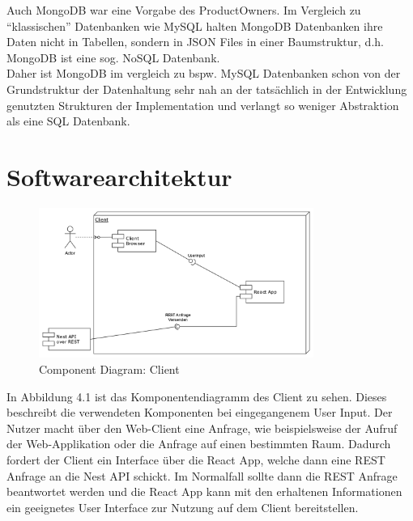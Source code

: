 Auch MongoDB war eine Vorgabe des ProductOwners.
Im Vergleich zu “klassischen” Datenbanken wie MySQL halten MongoDB Datenbanken ihre Daten nicht in Tabellen, sondern in JSON Files in einer Baumstruktur, d.h. MongoDB ist eine sog. NoSQL Datenbank. \\
Daher ist MongoDB im vergleich zu bspw. MySQL Datenbanken schon von der Grundstruktur der Datenhaltung sehr nah an der tatsächlich in der Entwicklung genutzten Strukturen der Implementation und verlangt so weniger Abstraktion als eine SQL Datenbank.
\pagebreak
\section{Softwarearchitektur}

\begin{figure}[!h]
    \centering
    \includegraphics[width=0.8\textwidth]{./UML_Diagrams/ComponentDiagramClient.png}
    \caption{Component Diagram: Client}
    \label{fig:ComponentDiagramClient}
\end{figure}
In Abbildung 4.1 ist das Komponentendiagramm des Client zu sehen.
Dieses beschreibt die verwendeten Komponenten bei eingegangenem User Input.
Der Nutzer macht über den Web-Client eine Anfrage, wie beispielsweise der Aufruf der Web-Applikation oder die Anfrage auf einen bestimmten Raum.
Dadurch fordert der Client ein Interface über die React App, welche dann eine REST Anfrage an die Nest API schickt.
Im Normalfall sollte dann die REST Anfrage beantwortet werden und die React App kann mit den erhaltenen Informationen ein geeignetes User Interface zur Nutzung auf dem Client bereitstellen.

